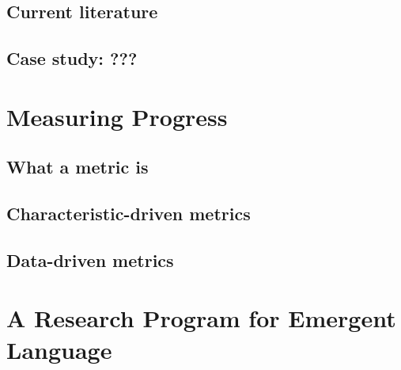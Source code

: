 \documentclass[letterpaper]{report}
\begin{document}
\section{Current literature}
\section{Case study: ???}

\chapter{Measuring Progress}
\section{What a metric is}
\section{Characteristic-driven metrics}
\section{Data-driven metrics}

\chapter{A Research Program for Emergent Language}
\end{document}

